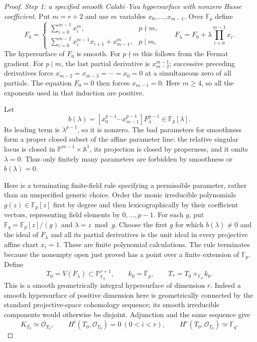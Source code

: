 \begin{proof}
\emph{Step 1: a specified smooth Calabi--Yau hypersurface with nonzero
Hasse coefficient.}
Put $m=r+2$ and use $m$ variables $x_0,\ldots,x_{m-1}$. Over
$\mathbb F_p$ define
\[
 F_0=
 \begin{cases}
  \sum_{i=0}^{m-1}x_i^m,&p\nmid m,\\[2pt]
  \displaystyle\sum_{i=0}^{m-2}x_i^{m-1}x_{i+1}+x_{m-1}^m,
       &p\mid m,
 \end{cases}
 \qquad
 F_\lambda=F_0+\lambda\prod_{i=0}^{m-1}x_i.
\]
The hypersurface of $F_0$ is smooth. For $p\nmid m$ this follows
from the Fermat gradient. For $p\mid m$, the last partial derivative
is $x_{m-2}^{m-1}$; successive preceding derivatives force
$x_{m-2}=x_{m-3}=\cdots=x_0=0$ at a simultaneous zero of all partials.
The equation $F_0=0$ then forces $x_{m-1}=0$. Here $m\ge4$, so all
the exponents used in that induction are positive.

Let
\[
 b(\lambda)=
 [x_0^{p-1}\cdots x_{m-1}^{p-1}]F_\lambda^{p-1}
       \in\mathbb F_p[\lambda].
\]
Its leading term is $\lambda^{p-1}$, so it is nonzero. The bad
parameters for smoothness form a proper closed subset of the affine
parameter line: the relative singular locus is closed in
$\mathbb P^{m-1}\times\mathbb A^1$, its projection is closed by
properness, and it omits $\lambda=0$. Thus only finitely many
parameters are forbidden by smoothness or $b(\lambda)=0$.

Here is a terminating finite-field rule specifying a permissible
parameter, rather than an unspecified generic choice. Order the monic
irreducible polynomials $g(z)\in\mathbb F_p[z]$ first by degree and
then lexicographically by their coefficient vectors, representing field
elements by $0,\ldots,p-1$. For each $g$, put
$\mathbb F_q=\mathbb F_p[z]/(g)$ and $\lambda=z\bmod g$.
Choose the first $g$ for which $b(\lambda)\ne0$ and the ideal of
$F_\lambda$ and all its partial derivatives is the unit ideal in every
projective affine chart $x_i=1$. These are finite polynomial calculations.
The rule terminates because the nonempty open just proved has a point
over a finite extension of $\mathbb F_p$. Define
\[
 T_0=V(F_\lambda)\subset\mathbb P^{r+1}_{\mathbb F_q},
 \qquad k_0=\overline{\mathbb F}_p,
 \qquad T_*=T_0\times_{\mathbb F_q}k_0.
\]
This is a smooth geometrically integral hypersurface of dimension $r$.
Indeed a smooth hypersurface of positive dimension here is geometrically
connected by the standard projective-space cohomology sequence; its
smooth irreducible components would otherwise be disjoint.
Adjunction and the same sequence give
\[
 K_{T_0}\simeq\mathcal O_{T_0},\qquad
 H^i(T_0,\mathcal O_{T_0})=0\ (0<i<r),\qquad
 H^r(T_0,\mathcal O_{T_0})\simeq\mathbb F_q.
\]


\end{proof}

